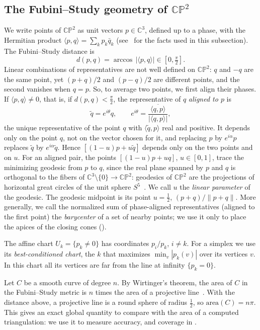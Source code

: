 \documentclass[11pt]{article}
\theoremstyle{plain}
\theoremstyle{definition}
\theoremstyle{remark}
\newcommand{\CP}{\mathbb{CP}}
\newcommand{\C}{\mathbb{C}}
\newcommand{\area}{\mathrm{area}}
\begin{document}
\subsection{The Fubini--Study geometry of \texorpdfstring{$\CP^2$}{CP2}}

We write points of $\CP^2$ as unit vectors $p\in\C^3$, defined up to a
phase, with the Hermitian product $\langle p,q\rangle=\sum_k p_k\bar q_k$
(see~\cite[chap.~4]{bengtssonzyczkowski2017} for the facts used in this
subsection). The Fubini--Study distance is
\[
  d(p,q)=\arccos\,|\langle p,q\rangle|\in[0,\tfrac{\pi}{2}].
\]
Linear combinations of representatives are not well defined on $\CP^2$:
$q$ and $-q$ are the same point, yet $(p+q)/2$ and $(p-q)/2$ are
different points, and the second vanishes when $q=p$. So, to average two
points, we first align their phases. If $\langle p,q\rangle\ne0$, that
is, if $d(p,q)<\frac{\pi}{2}$, the representative of $q$
\emph{aligned to $p$} is
\[
  \tilde q=e^{i\theta}q,\qquad
  e^{i\theta}=\frac{\overline{\langle q,p\rangle}}{|\langle q,p\rangle|},
\]
the unique representative of the point $q$ with $\langle\tilde q,p\rangle$
real and positive. It depends only on the point $q$, not on the vector
chosen for it, and replacing $p$ by $e^{i\alpha}p$ replaces $\tilde q$ by
$e^{i\alpha}\tilde q$. Hence $[(1-u)p+u\tilde q]$ depends only on the two
points and on $u$. For an aligned pair,
the points $[(1-u)p+uq]$, $u\in[0,1]$, trace the minimizing geodesic from
$p$ to $q$, since the real plane spanned by $p$ and $q$ is orthogonal to
the fibers of $\C^3\setminus\{0\}\to\CP^2$: geodesics of $\CP^2$ are the
projections of horizontal great circles of the unit sphere
$S^5$~\cite{bengtssonzyczkowski2017}. We call $u$ the \emph{linear
parameter} of the geodesic. The geodesic midpoint is its point $u=\frac12$,
$(p+q)/\|p+q\|$. More generally, we call the normalized sum of
phase-aligned representatives (aligned to the first point) the
\emph{barycenter} of a set of nearby points; we use it only to place the
apices of the closing cones ().

The affine chart $U_k=\{p_k\ne0\}$ has coordinates $p_i/p_k$, $i\ne k$.
For a simplex we use its \emph{best-conditioned chart}, the $k$ that
maximizes $\min_v|p_k(v)|$ over its vertices $v$. In this chart all its
vertices are far from the line at infinity $\{p_k=0\}$.

Let $C$ be a smooth curve of degree $n$. By Wirtinger's theorem, the area
of $C$ in the Fubini--Study metric is $n$ times the area of a projective
line~\cite{griffithsharris1978}. With the distance above, a projective
line is a round sphere of radius $\frac12$, so $\area(C)=n\pi$. This gives an exact global quantity to
compare with the area of a computed triangulation: we use it to measure
accuracy, and coverage in .
\end{document}

